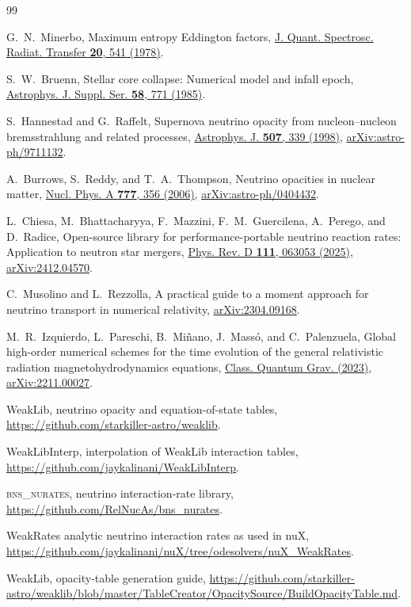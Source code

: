 \documentclass[aps,prd,reprint,nofootinbib,notitlepage]{revtex4-2}
\begin{document}
\begin{thebibliography}{99}

G.~N.~Minerbo, Maximum entropy Eddington factors,
\href{https://doi.org/10.1016/0022-4073(78)90024-9}{J. Quant. Spectrosc.
Radiat. Transfer \textbf{20}, 541 (1978)}.

S.~W.~Bruenn, Stellar core collapse: Numerical model and infall epoch,
\href{https://doi.org/10.1086/191056}{Astrophys. J. Suppl. Ser.
\textbf{58}, 771 (1985)}.

S.~Hannestad and G.~Raffelt, Supernova neutrino opacity from
nucleon--nucleon bremsstrahlung and related processes,
\href{https://doi.org/10.1086/306303}{Astrophys. J. \textbf{507}, 339 (1998)},
\href{https://arxiv.org/abs/astro-ph/9711132}{arXiv:astro-ph/9711132}.

A.~Burrows, S.~Reddy, and T.~A.~Thompson, Neutrino opacities in nuclear matter,
\href{https://doi.org/10.1016/j.nuclphysa.2004.06.012}{Nucl. Phys. A
\textbf{777}, 356 (2006)},
\href{https://arxiv.org/abs/astro-ph/0404432}{arXiv:astro-ph/0404432}.

L.~Chiesa, M.~Bhattacharyya, F.~Mazzini, F.~M.~Guercilena, A.~Perego,
and D.~Radice, Open-source library for performance-portable neutrino
reaction rates: Application to neutron star mergers,
\href{https://doi.org/10.1103/PhysRevD.111.063053}{Phys. Rev. D
\textbf{111}, 063053 (2025)},
\href{https://arxiv.org/abs/2412.04570}{arXiv:2412.04570}.

C.~Musolino and L.~Rezzolla, A practical guide to a moment approach for
neutrino transport in numerical relativity,
\href{https://arxiv.org/abs/2304.09168}{arXiv:2304.09168}.

M.~R.~Izquierdo, L.~Pareschi, B.~Mi\~nano, J.~Mass\'o, and C.~Palenzuela,
Global high-order numerical schemes for the time evolution of the
general relativistic radiation magnetohydrodynamics equations,
\href{https://doi.org/10.1088/1361-6382/acd97f}{Class. Quantum Grav. (2023)},
\href{https://arxiv.org/abs/2211.00027}{arXiv:2211.00027}.

WeakLib, neutrino opacity and equation-of-state tables,
\url{https://github.com/starkiller-astro/weaklib}.

WeakLibInterp, interpolation of WeakLib interaction tables,
\url{https://github.com/jaykalinani/WeakLibInterp}.

\textsc{bns\_nurates}, neutrino interaction-rate library,
\url{https://github.com/RelNucAs/bns_nurates}.

WeakRates analytic neutrino interaction rates as used in nuX,
\url{https://github.com/jaykalinani/nuX/tree/odesolvers/nuX_WeakRates}.

WeakLib, opacity-table generation guide,
\url{https://github.com/starkiller-astro/weaklib/blob/master/TableCreator/OpacitySource/BuildOpacityTable.md}.

\end{thebibliography}
\end{document}
